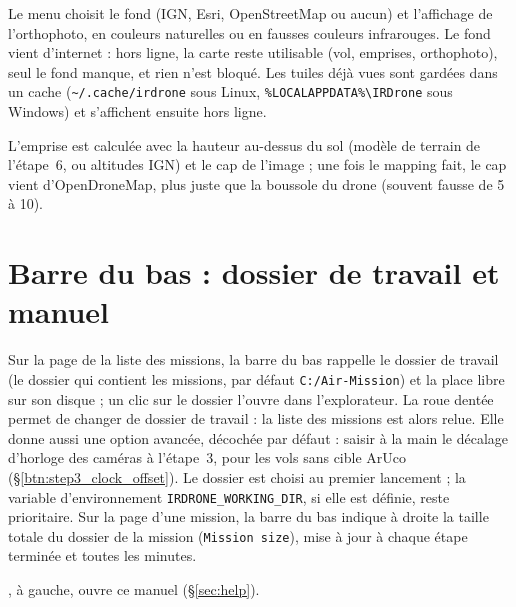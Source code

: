\documentclass[a4paper,11pt]{report}
\DeclareRobustCommand{\bouton}[1]{\texorpdfstring{\fbox{\small\textsf{#1}}}{#1}}
\begin{document}
Le menu \bouton{Layers} choisit le fond (IGN, Esri, OpenStreetMap ou aucun) et l'affichage de l'orthophoto, en couleurs naturelles ou en fausses couleurs infrarouges. Le fond vient d'internet : hors ligne, la carte reste utilisable (vol, emprises, orthophoto), seul le fond manque, et rien n'est bloqué. Les tuiles déjà vues sont gardées dans un cache (\texttt{\textasciitilde/.cache/irdrone} sous Linux, \texttt{\%LOCALAPPDATA\%\textbackslash IRDrone} sous Windows) et s'affichent ensuite hors ligne.

L'emprise est calculée avec la hauteur au-dessus du sol (modèle de terrain de l'étape~6, ou altitudes IGN) et le cap de l'image ; une fois le mapping fait, le cap vient d'OpenDroneMap, plus juste que la boussole du drone (souvent fausse de 5 à 10\textdegree).


\section{Barre du bas : dossier de travail et manuel}\label{btn:home_workdir}
Sur la page de la liste des missions, la barre du bas rappelle le dossier de travail (le dossier qui contient les missions, par défaut \texttt{C:/Air-Mission}) et la place libre sur son disque ; un clic sur le dossier l'ouvre dans l'explorateur. La roue dentée \bouton{⚙} permet de changer de dossier de travail : la liste des missions est alors relue. Elle donne aussi une option avancée, décochée par défaut : saisir à la main le décalage d'horloge des caméras à l'étape~3, pour les vols sans cible ArUco (§\ref{btn:step3_clock_offset}). Le dossier est choisi au premier lancement ; la variable d'environnement \texttt{IRDRONE\_WORKING\_DIR}, si elle est définie, reste prioritaire. Sur la page d'une mission, la barre du bas indique à droite la taille totale du dossier de la mission (\texttt{Mission size}), mise à jour à chaque étape terminée et toutes les minutes.

\bouton{?}, à gauche, ouvre ce manuel (§\ref{sec:help}).
\end{document}
